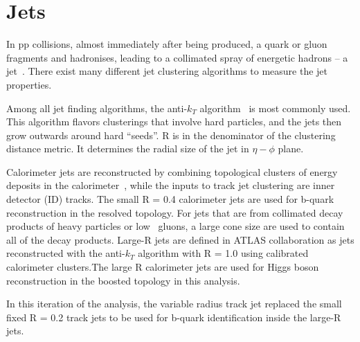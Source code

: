 \section{Jets}
\label{sec:jets}
\par In pp collisions, almost immediately after being produced, a quark or gluon fragments and hadronises, leading to a collimated spray of energetic hadrons -- 
a jet~\cite{Salam:2009jx}. There exist many different jet clustering algorithms to measure the jet properties. 
\par Among all jet finding algorithms, the anti-$k_T$ algorithm~\cite{Cacciari:2008gp} is most commonly used. This algorithm flavors clusterings that involve hard particles, 
and the jets then grow outwards around hard ``seeds''. R is in the denominator of the clustering distance metric. It determines the radial size of the jet in $\eta-\phi$ plane.
\par Calorimeter jets are reconstructed by combining topological clusters of energy deposits in the calorimeter~\cite{Aad:2011he}, while the inputs to track jet clustering are inner detector (ID) tracks. 
The small R = 0.4 calorimeter jets are used for b-quark reconstruction in the resolved topology. For jets that are from collimated decay products of heavy particles or low \pt~gluons, 
a large cone size are used to contain all of the decay products. Large-R jets are defined in ATLAS collaboration as jets reconstructed with the anti-$k_T$ algorithm with R = 1.0 using calibrated 
calorimeter clusters.The large R calorimeter jets are used for Higgs boson reconstruction in the boosted topology in this analysis.
\par In this iteration of the analysis, the variable radius track jet replaced the small fixed R = 0.2 track jets to be used for b-quark identification inside the large-R jets.

